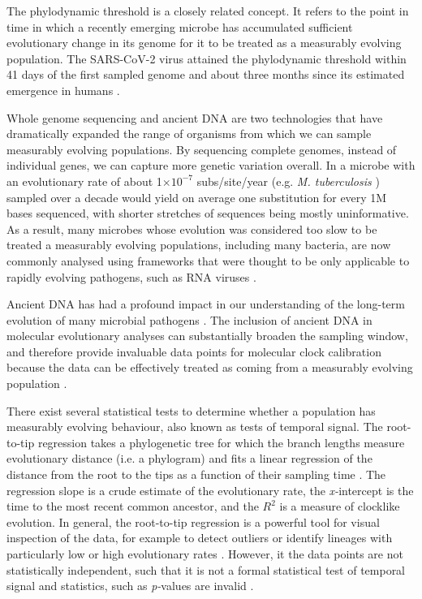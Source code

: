 \documentclass[10pt,letterpaper]{article}
\begin{document}
The phylodynamic threshold is a closely related concept. It refers to the point in time in which a recently emerging microbe has accumulated sufficient evolutionary change in its genome for it to be treated as a measurably evolving population. The SARS-CoV-2 virus attained the phylodynamic threshold within 41 days of the first sampled genome and about three months since its estimated emergence in humans \cite{duchene2020temporal}.

Whole genome sequencing and ancient DNA are two technologies that have dramatically expanded the range of organisms from which we can sample measurably evolving populations. By sequencing complete genomes, instead of individual genes, we can capture more genetic variation overall. In a microbe with an evolutionary rate of about 1$\times 10^{-7}$ subs/site/year (e.g. \textit{M. tuberculosis} \cite{menardo2019molecular}) sampled over a decade would yield on average one substitution for every 1M bases sequenced, with shorter stretches of sequences being mostly uninformative. As a result, many microbes whose evolution was considered too slow to be treated a measurably evolving populations, including many bacteria, are now commonly analysed using frameworks that were thought to be only applicable to rapidly evolving pathogens, such as RNA viruses \cite{biek2015measurably}.

Ancient DNA has had a profound impact in our understanding of the long-term evolution of many microbial pathogens \cite{duchene2020recovery,spyrou2019ancient}. The inclusion of ancient DNA in molecular evolutionary analyses can substantially broaden the sampling window, and therefore provide invaluable data points for molecular clock calibration because the data can be effectively treated as coming from a measurably evolving population \cite{ho2020dating}.

There exist several statistical tests to determine whether a population has measurably evolving behaviour, also known as tests of temporal signal. The root-to-tip regression takes a phylogenetic tree for which the branch lengths measure evolutionary distance (i.e. a phylogram) and fits a linear regression of the distance from the root to the tips as a function of their sampling time \cite{korber2000timing}. The regression slope is a crude estimate of the evolutionary rate, the \textit{x-}intercept is the time to the most recent common ancestor, and the $R^2$ is a measure of clocklike evolution. In general, the root-to-tip regression is a powerful tool for visual inspection of the data, for example to detect outliers or identify lineages with particularly low or high evolutionary rates \cite{rambaut2016exploring,featherstone2023clockor2,volz2017scalable}. However, it the data points are not statistically independent, such that it is not a formal statistical test of temporal signal and statistics, such as \textit{p-}values are invalid \cite{rieux2016inferences}.
\end{document}
